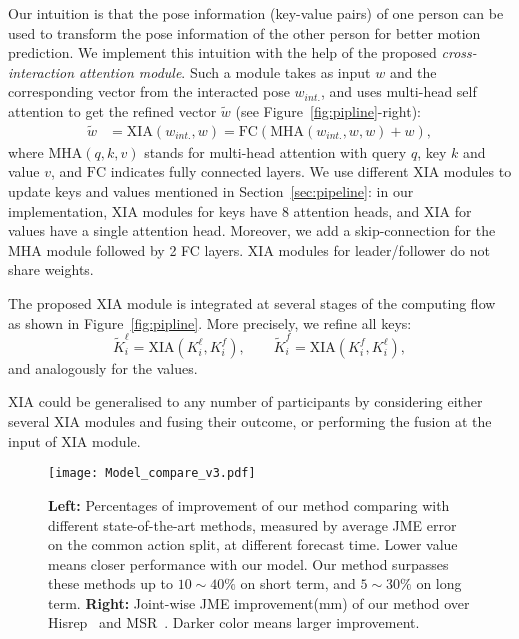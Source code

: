 Our intuition is that the pose information (key-value pairs) of one person can be used to transform the pose information of the other person for better motion prediction. We implement this intuition with the help of the proposed \textit{cross-interaction attention module}. Such a module takes as input $w$ and the corresponding vector from the interacted pose $w_{int.}$, and uses multi-head self attention to get the refined vector $\tilde{w}$ (see Figure~\ref{fig:pipline}-right):
\begin{align}
\tilde{w} & = \textrm{XIA}(w_{int.},w)
     = \textrm{FC}(\textrm{MHA}(w_{int.},w,w) + w),
\end{align} 
where $\textrm{MHA}(q,k,v)$ stands for multi-head attention with query $q$, key $k$ and value $v$, and $\textrm{FC}$ indicates fully connected layers.
We use different XIA modules to update keys and values mentioned in Section~\ref{sec:pipeline}: in our implementation, XIA modules for keys have 8 attention heads, and XIA for values have a single attention head. Moreover, we add a skip-connection for the MHA module followed by 2 FC layers. XIA modules for leader/follower do not share weights.

The proposed XIA module is integrated at several stages of the computing flow as shown in Figure~\ref{fig:pipline}. More precisely, we refine all keys:
\begin{equation}
  \tilde{K}_i^\ell = \textrm{XIA}(K_i^\ell,K_i^f), \qquad \tilde{K}_i^f = \textrm{XIA}(K_i^f,K_i^\ell),
\end{equation}
and analogously for the values. 

XIA could be  generalised to any number of participants by considering either several XIA modules and fusing their outcome, or performing the fusion at the input of XIA module.

\begin{figure*}[t]
\centering
\texttt{[image: Model\_compare\_v3.pdf]}
\vspace{-0.3cm}
  \caption{\textbf{Left:} Percentages of improvement of  our method comparing with different state-of-the-art methods, measured by average JME error on the common action split, at different forecast time. Lower value means closer performance with our model. Our method surpasses these methods up to $10\sim40\%$ on short term,  and $5\sim30\%$ on long term. \textbf{Right:} Joint-wise JME improvement(mm) of our method over Hisrep~\cite{mao2020history} and MSR~\cite{Li_2021_ICCV}. Darker color means larger improvement.}\vspace{-5mm}
\label{fig:res_ca}
\end{figure*}


